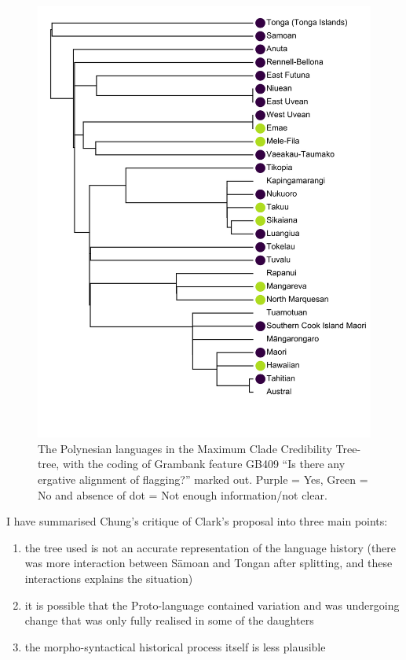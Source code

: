 \documentclass[12pt,letterpaper]{article}
\begin{document}
\begin{figure}[p]
\centering
\includegraphics[width=16cm]{illustrations/plots_from_R//tree_plots/poly_tree_example.png}
\caption{{The Polynesian languages in the \citet{grayetal_2009} Maximum Clade Credibility Tree-tree, with the coding of Grambank feature GB409 ``Is there any ergative alignment of flagging?'' marked out. Purple = Yes, Green = No and absence of dot = Not enough information/not clear.}}
\label{poly_GB409_tree}
\end{figure} 

I have summarised Chung's critique of Clark's proposal into three main points:
 
\begin{enumerate}[label=(\alph*)]
\item the tree used is not an accurate representation of the language history (there was more interaction between S\={a}moan and Tongan after splitting, and these interactions explains the situation)
\item it is possible that the Proto-language contained variation and was undergoing change that was only fully realised in some of the daughters
\item the morpho-syntactical historical process itself is less plausible
\end{enumerate}
\end{document}
